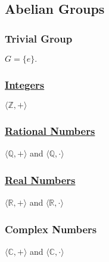 \subsection{Abelian Groups}

\subsubsection{Trivial Group}\label{trivialgroup}
$G = \{ e \}.$

\subsubsection{\hyperref[integers]{Integers}}
$\langle \mathbb{Z}, + \rangle$

\subsubsection{\hyperref[rationals]{Rational Numbers}}
$\langle \mathbb{Q}, + \rangle$ and $\langle \mathbb{Q}, \cdot \rangle$

\subsubsection{\hyperref[realnumberswithdedekindcuts]{Real Numbers}}
$\langle \mathbb{R}, + \rangle$ and $\langle \mathbb{R}, \cdot \rangle$

\subsubsection{Complex Numbers}
$\langle \mathbb{C}, + \rangle$ and $\langle \mathbb{C}, \cdot \rangle$